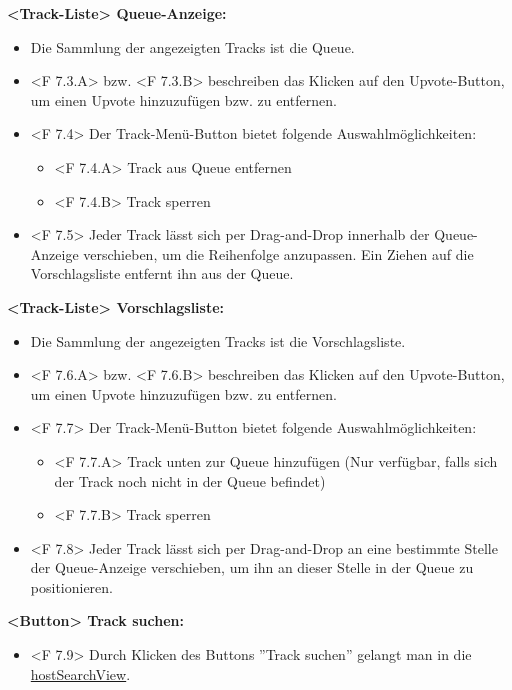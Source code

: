 \documentclass[oneside, ngerman]{sdqtechreport}
\begin{document}
\textbf{<Track-Liste> Queue-Anzeige:}
\begin{itemize}
    \item Die Sammlung der angezeigten Tracks ist die Queue.
    \item <F 7.3.A> bzw. <F 7.3.B> beschreiben das Klicken auf den Upvote-Button, um einen Upvote hinzuzufügen bzw. zu entfernen.
    \item <F 7.4> Der Track-Menü-Button bietet folgende Auswahlmöglichkeiten:
    \begin{itemize}
        \item <F 7.4.A> Track aus Queue entfernen
        \item <F 7.4.B> Track sperren
    \end{itemize}
    \item <F 7.5> Jeder Track lässt sich per Drag-and-Drop innerhalb der Queue-Anzeige verschieben, um die Reihenfolge anzupassen. Ein Ziehen auf die Vorschlagsliste entfernt ihn aus der Queue.
\end{itemize}

\textbf{<Track-Liste> Vorschlagsliste:}
\begin{itemize}
    \item Die Sammlung der angezeigten Tracks ist die Vorschlagsliste.
    \item <F 7.6.A> bzw. <F 7.6.B> beschreiben das Klicken auf den Upvote-Button, um einen Upvote hinzuzufügen bzw. zu entfernen.
    \item <F 7.7> Der Track-Menü-Button bietet folgende Auswahlmöglichkeiten:
    \begin{itemize}
        \item <F 7.7.A> Track unten zur Queue hinzufügen (Nur verfügbar, falls sich der Track noch nicht in der Queue befindet)
        \item <F 7.7.B> Track sperren
    \end{itemize}
    \item <F 7.8> Jeder Track lässt sich per Drag-and-Drop an eine bestimmte Stelle der Queue-Anzeige verschieben, um ihn an dieser Stelle in der Queue zu positionieren.
\end{itemize}

\textbf{<Button> Track suchen:}
\begin{itemize}
    \item <F 7.9> Durch Klicken des Buttons ''Track suchen'' gelangt man in die \hyperlink{hostSearchView}{hostSearchView}.
\end{itemize}
\end{document}
